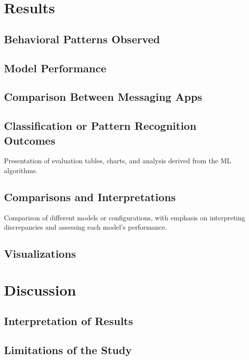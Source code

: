 \documentclass[a4paper,12pt]{report}
\begin{document}
\chapter{Results}
\section{Behavioral Patterns Observed}

\section{Model Performance}

\section{Comparison Between Messaging Apps}

\section{Classification or Pattern Recognition Outcomes}
Presentation of evaluation tables, charts, and analysis derived from the ML algorithms.

\section{Comparisons and Interpretations}
Comparison of different models or configurations, with emphasis on interpreting discrepancies and assessing each model’s performance.

\section{ Visualizations}

\chapter{Discussion}

\section{Interpretation of Results}

\section{Limitations of the Study}
\end{document}
